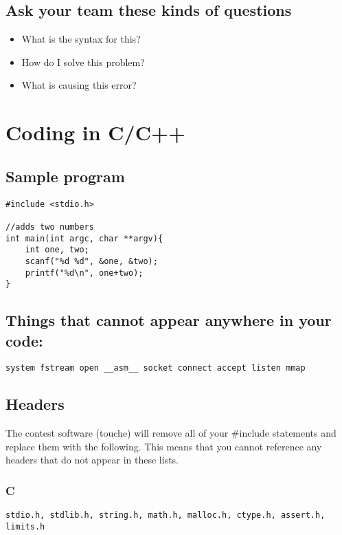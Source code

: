 \documentclass{article}
\begin{document}
	\subsection{Ask your team these kinds of questions}
	\begin{itemize}
		\item What is the syntax for this?
		\item How do I solve this problem?
		\item What is causing this error?
	\end{itemize}
	
	\section{Coding in C/C++}
	\subsection{Sample program}
	\lstset{language=C}
	\lstset{breaklines=true}
	\begin{lstlisting}
#include <stdio.h>

//adds two numbers
int main(int argc, char **argv){
	int one, two;
	scanf("%d %d", &one, &two);
	printf("%d\n", one+two);
}
	\end{lstlisting}

	\subsection{Things that cannot appear anywhere in your code:}
	\begin{lstlisting}
system fstream open __asm__ socket connect accept listen mmap
	\end{lstlisting}

	\subsection{Headers}
	The contest software (touche) will remove all of your \#include statements 
	and replace them with the following. 
	This means that you cannot reference any headers that do not appear in these lists.

	\subsubsection{C}
	\begin{lstlisting}
stdio.h, stdlib.h, string.h, math.h, malloc.h, ctype.h, assert.h, limits.h
	\end{lstlisting}
	
\end{document}
